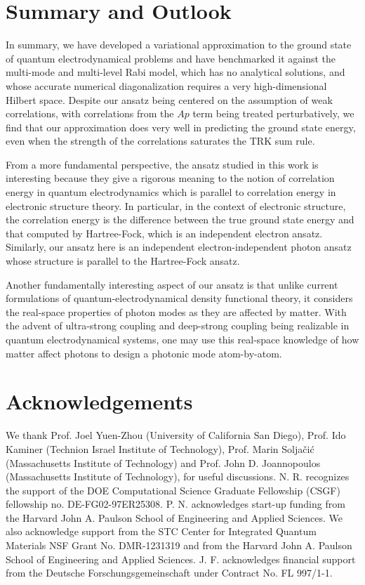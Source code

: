 \documentclass[aps,prb,twocolumn,
	groupedaddress,superscriptaddress,
	amsfonts,amssymb,amsmath,floatfix,
	citeautoscript]{revtex4-1}
\begin{document}
\section{Summary and Outlook}
In summary, we have developed a variational approximation to the ground state of quantum electrodynamical problems and have benchmarked it against the multi-mode and multi-level Rabi model, which has no analytical solutions, and whose accurate numerical diagonalization requires a very high-dimensional Hilbert space. Despite our ansatz being centered on the assumption of weak correlations, with correlations from the $Ap$ term being treated perturbatively, we find that our approximation does very well in predicting the ground state energy, even when the strength of the correlations saturates the TRK sum rule. 

From a more fundamental perspective, the ansatz studied in this work is interesting because they give a rigorous meaning to the notion of correlation energy in quantum electrodynamics which is parallel to correlation energy in electronic structure theory. In particular, in the context of electronic structure, the correlation energy is the difference between the true ground state energy and that computed by Hartree-Fock, which is an independent electron ansatz. Similarly, our ansatz here is an independent electron-independent photon ansatz whose structure is parallel to the Hartree-Fock ansatz. 

Another fundamentally interesting aspect of our ansatz is that unlike current formulations of quantum-electrodynamical density functional theory, it considers the real-space properties of photon modes as they are affected by matter. With the advent of ultra-strong coupling and deep-strong coupling being realizable in quantum electrodynamical systems, one may use this real-space knowledge of how matter affect photons to design a photonic mode atom-by-atom.

\section{Acknowledgements}
We thank Prof. Joel Yuen-Zhou (University of California San Diego), Prof. Ido Kaminer (Technion Israel Institute of Technology), Prof. Marin Solja\v{c}i\'{c} (Massachusetts Institute of Technology) and Prof. John D. Joannopoulos (Massachusetts Institute of Technology), for useful discussions. N. R. recognizes the support of the DOE Computational Science Graduate Fellowship (CSGF) fellowship no.  DE-FG02-97ER25308. P. N. acknowledges start-up funding from the Harvard John A. Paulson School of Engineering and Applied Sciences.  We also acknowledge support from the STC Center for Integrated Quantum Materials NSF Grant No. DMR-1231319 and from the Harvard John A. Paulson School of Engineering and Applied Sciences. J. F. acknowledges financial support from the Deutsche Forschungsgemeinschaft under Contract No. FL 997/1-1.




\end{document}

